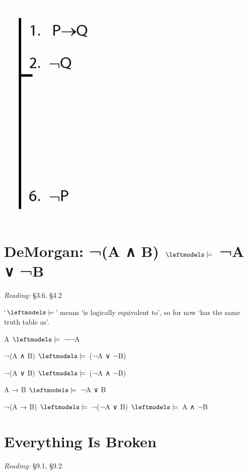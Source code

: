 \documentclass[12pt]{extarticle}
\begin{document}
\begin{multicols*}{3}
\begin{center}
\includegraphics[scale=0.3]{img/unit_283_proof.png}
\end{center}
 
\begin{minipage}{\columnwidth} 
\section{DeMorgan: ¬(A ∧ B) $\leftmodels\models$ ¬A ∨ ¬B}
 
\emph{Reading:} §3.6, §4.2
 
`$\leftmodels\models$' means `is logically equivalent to', so for now `has the same truth table as'.
 
A $\leftmodels\models$ ¬¬A
 
¬(A ∧ B) $\leftmodels\models$ (¬A ∨ ¬B)
 
¬(A ∨ B) $\leftmodels\models$ (¬A ∧ ¬B)
 
A → B $\leftmodels\models$ ¬A ∨ B
 
¬(A → B) $\leftmodels\models$ ¬(¬A ∨ B) $\leftmodels\models$ A ∧ ¬B
 
\end{minipage} 
 
\section{Everything Is Broken}
 
\emph{Reading:} §9.1, §9.2
 

\end{multicols*}
\end{document}

